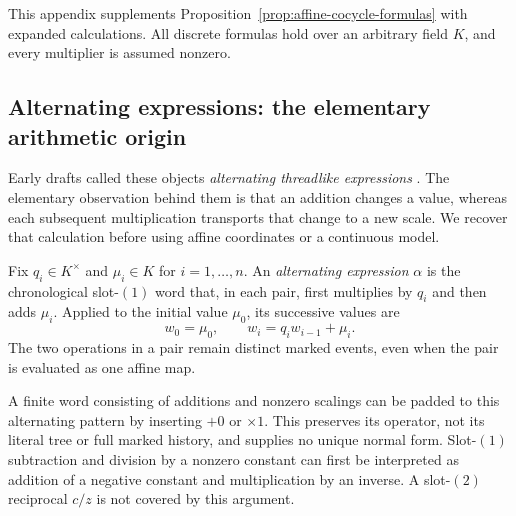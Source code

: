 This appendix supplements Proposition~\ref{prop:affine-cocycle-formulas} with
expanded calculations.  All discrete formulas hold over an arbitrary field
$K$, and every multiplier is assumed nonzero.

\subsection{Alternating expressions: the elementary arithmetic origin}
\label{subsec:appendix-alternating-origin}

Early drafts called these objects \emph{alternating threadlike expressions}
\cite{Yuan2023AEGAlternatingExpressions}.  The elementary observation behind
them is that an addition changes a value, whereas each subsequent
multiplication transports that change to a new scale.  We recover that
calculation before using affine coordinates or a continuous model.

\begin{definition}
\label{def:appendix-alternating-expression}
Fix $q_i\in K^\times$ and $\mu_i\in K$ for $i=1,\ldots,n$.  An
\emph{alternating expression} $\alpha$ is the chronological slot-$(1)$ word that,
in each pair, first multiplies by $q_i$ and then adds $\mu_i$.  Applied to
the initial value $\mu_0$, its successive values are
\begin{equation}
  w_0=\mu_0,\qquad w_i=q_iw_{i-1}+\mu_i.
  \label{eq:appendix-alternating-arithmetic-recursion}
\end{equation}
The two operations in a pair remain distinct marked events, even when the
pair is evaluated as one affine map.
\end{definition}

A finite word consisting of additions and nonzero scalings can be padded to
this alternating pattern by inserting $+0$ or $\times1$.  This preserves its
operator, not its literal tree or full marked history, and supplies no unique
normal form.  Slot-$(1)$ subtraction and division by a nonzero constant can
first be interpreted as addition of a negative constant and multiplication by
an inverse.  A slot-$(2)$ reciprocal $c/z$ is not covered by this argument.

